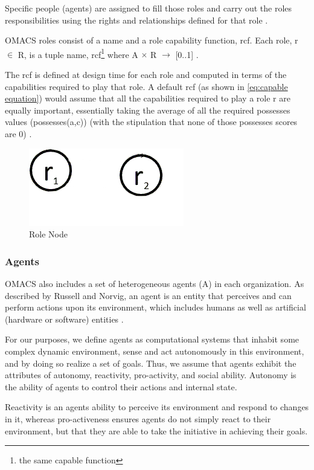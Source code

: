 Specific people (agents) are assigned to fill those roles and carry out the roles responsibilities using the rights and
relationships defined for that role \cite{omacs2}.

OMACS roles consist of a name and a role capability function, rcf. Each role, r $\in$ R, is a tuple
\textlangle{} name, rcf\footnote{the same capable function} \textrangle{} where A $\times$ R $\rightarrow$ {[}0..1{]} .


The rcf is defined at design time for each role and computed in terms of 
the capabilities required to play that role.
A default rcf (as shown in \ref{eq:capable equation}) 
would assume that all the capabilities required to play a role r are equally important,
essentially taking the average of all the required possesses values (possesses(a,c))
(with the stipulation that none of those possesses scores are 0) \cite{omacs4}.
\hspace{1.5cm}
\begin{figure}[th]
	\centering
		\includegraphics[scale=0.5]{ch1/img/roles}
	\caption{\label{fig:Role Node}Role Node}
\end{figure}
\hspace{1cm}
\subsubsection{Agents}

OMACS also includes a set of heterogeneous agents (A) in each organization. 
As described by Russell and Norvig, an agent is an entity that perceives and can perform actions upon its
environment, which includes humans as well as artificial (hardware or software) entities \cite{omacs2}.

For our purposes, we define agents as computational systems that inhabit some complex dynamic
environment, sense and act autonomously in this environment, and by doing so realize a set of
goals. Thus, we assume that agents exhibit the attributes of autonomy, reactivity, pro-activity, and
social ability. Autonomy is the ability of agents to control their actions and internal state.


Reactivity is an agents ability to perceive its environment and respond to changes in it, whereas
pro-activeness ensures agents do not simply react to their environment, but that they are able to
take the initiative in achieving their goals. 

